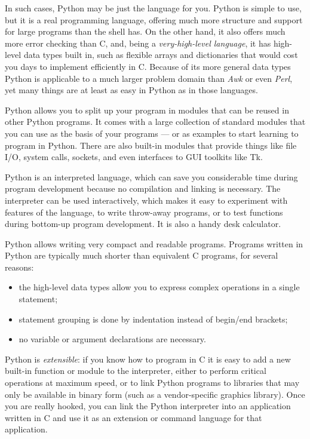 In such cases, Python may be just the language for you.  Python is
simple to use, but it is a real programming language, offering much
more structure and support for large programs than the shell has.  On
the other hand, it also offers much more error checking than C, and,
being a \emph{very-high-level language}, it has high-level data types
built in, such as flexible arrays and dictionaries that would cost you
days to implement efficiently in C.  Because of its more general data
types Python is applicable to a much larger problem domain than
\emph{Awk} or even \emph{Perl}, yet many things are at least as easy
in Python as in those languages.

Python allows you to split up your program in modules that can be
reused in other Python programs.  It comes with a large collection of
standard modules that you can use as the basis of your programs --- or
as examples to start learning to program in Python.  There are also
built-in modules that provide things like file I/O, system calls,
sockets, and even interfaces to GUI toolkits like Tk.  

Python is an interpreted language, which can save you considerable time
during program development because no compilation and linking is
necessary.  The interpreter can be used interactively, which makes it
easy to experiment with features of the language, to write throw-away
programs, or to test functions during bottom-up program development.
It is also a handy desk calculator.

Python allows writing very compact and readable programs.  Programs
written in Python are typically much shorter than equivalent C
programs, for several reasons:
\begin{itemize}
\item
the high-level data types allow you to express complex operations in a
single statement;
\item
statement grouping is done by indentation instead of begin/end
brackets;
\item
no variable or argument declarations are necessary.
\end{itemize}

Python is \emph{extensible}: if you know how to program in C it is easy
to add a new built-in function or module to the interpreter, either to
perform critical operations at maximum speed, or to link Python
programs to libraries that may only be available in binary form (such
as a vendor-specific graphics library).  Once you are really hooked,
you can link the Python interpreter into an application written in C
and use it as an extension or command language for that application.

